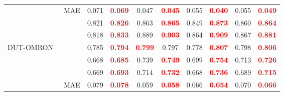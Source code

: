 \documentclass[runningheads]{llncs}
\begin{document}
\begin{table}[H]
{\begin{tabular}{l|l|cc|cc|cc|cc}
                                               & MAE                                                         & 0.071                           & \textcolor{red}{\textbf{0.069}} & 0.047                           & \textcolor{red}{\textbf{0.045}} & 0.055 & \textcolor{red}{\textbf{0.040}} & 0.055                           & \textcolor{red}{\textbf{0.049}} \\
                                               &                                                      & 0.821                           & \textcolor{red}{\textbf{0.826}} & 0.863                           & \textcolor{red}{\textbf{0.865}} & 0.849 & \textcolor{red}{\textbf{0.873}} & 0.860                           & \textcolor{red}{\textbf{0.864}} \\
                                               &                                                      & 0.818                           & \textcolor{red}{\textbf{0.833}} & 0.889                           & \textcolor{red}{\textbf{0.903}} & 0.864 & \textcolor{red}{\textbf{0.909}} & 0.867                           & \textcolor{red}{\textbf{0.881}} \\ \hline
   \multirow{6}{*}{DUT-OMRON~\cite{DUT-OMRON}} &                                                    & 0.785                           & \textcolor{red}{\textbf{0.794}} & \textcolor{red}{\textbf{0.799}} & 0.797                           & 0.778 & \textcolor{red}{\textbf{0.807}} & 0.798                           & \textcolor{red}{\textbf{0.806}} \\
                                               &                                                    & 0.668                           & \textcolor{red}{\textbf{0.685}} & 0.739                           & \textcolor{red}{\textbf{0.749}} & 0.699 & \textcolor{red}{\textbf{0.754}} & 0.713                           & \textcolor{red}{\textbf{0.726}} \\
                                               &                                         & 0.669                           & \textcolor{red}{\textbf{0.693}} & 0.714                           & \textcolor{red}{\textbf{0.732}} & 0.668 & \textcolor{red}{\textbf{0.736}} & 0.689                           & \textcolor{red}{\textbf{0.715}} \\
                                               & MAE                                                         & 0.079                           & \textcolor{red}{\textbf{0.078}} & 0.059                           & \textcolor{red}{\textbf{0.058}} & 0.066 & \textcolor{red}{\textbf{0.054}} & 0.070                           & \textcolor{red}{\textbf{0.066}} \\

\end{tabular}}
\end{table}
\end{document}
